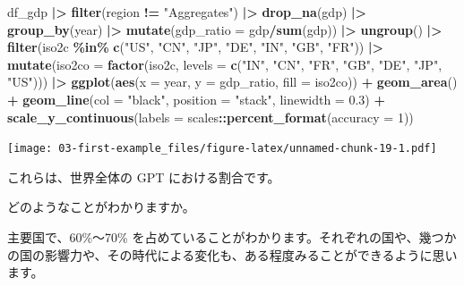 \documentclass[
  xelatex, ja=standard]{bxjsbook}
\newenvironment{Shaded}{\begin{snugshade}}{\end{snugshade}}
\newcommand{\AttributeTok}[1]{\textcolor[rgb]{0.13,0.29,0.53}{#1}}
\newcommand{\DecValTok}[1]{\textcolor[rgb]{0.00,0.00,0.81}{#1}}
\newcommand{\FloatTok}[1]{\textcolor[rgb]{0.00,0.00,0.81}{#1}}
\newcommand{\FunctionTok}[1]{\textcolor[rgb]{0.13,0.29,0.53}{\textbf{#1}}}
\newcommand{\NormalTok}[1]{#1}
\newcommand{\SpecialCharTok}[1]{\textcolor[rgb]{0.81,0.36,0.00}{\textbf{#1}}}
\newcommand{\StringTok}[1]{\textcolor[rgb]{0.31,0.60,0.02}{#1}}
\theoremstyle{definition}
\theoremstyle{definition}
\theoremstyle{definition}
\theoremstyle{definition}
\theoremstyle{remark}
\begin{document}
\begin{Shaded}
\begin{Highlighting}[]
\NormalTok{df\_gdp }\SpecialCharTok{|\textgreater{}} 
  \FunctionTok{filter}\NormalTok{(region }\SpecialCharTok{!=} \StringTok{"Aggregates"}\NormalTok{) }\SpecialCharTok{|\textgreater{}} \FunctionTok{drop\_na}\NormalTok{(gdp) }\SpecialCharTok{|\textgreater{}} 
  \FunctionTok{group\_by}\NormalTok{(year) }\SpecialCharTok{|\textgreater{}} \FunctionTok{mutate}\NormalTok{(}\AttributeTok{gdp\_ratio =}\NormalTok{ gdp}\SpecialCharTok{/}\FunctionTok{sum}\NormalTok{(gdp)) }\SpecialCharTok{|\textgreater{}} \FunctionTok{ungroup}\NormalTok{() }\SpecialCharTok{|\textgreater{}}
  \FunctionTok{filter}\NormalTok{(iso2c }\SpecialCharTok{\%in\%} \FunctionTok{c}\NormalTok{(}\StringTok{"US"}\NormalTok{, }\StringTok{"CN"}\NormalTok{, }\StringTok{"JP"}\NormalTok{, }\StringTok{"DE"}\NormalTok{, }\StringTok{"IN"}\NormalTok{, }\StringTok{"GB"}\NormalTok{, }\StringTok{"FR"}\NormalTok{))  }\SpecialCharTok{|\textgreater{}}
  \FunctionTok{mutate}\NormalTok{(}\AttributeTok{iso2co =} \FunctionTok{factor}\NormalTok{(iso2c, }\AttributeTok{levels =} \FunctionTok{c}\NormalTok{(}\StringTok{"IN"}\NormalTok{, }\StringTok{"CN"}\NormalTok{, }\StringTok{"FR"}\NormalTok{, }\StringTok{"GB"}\NormalTok{, }\StringTok{"DE"}\NormalTok{, }\StringTok{"JP"}\NormalTok{, }\StringTok{"US"}\NormalTok{))) }\SpecialCharTok{|\textgreater{}}
  \FunctionTok{ggplot}\NormalTok{(}\FunctionTok{aes}\NormalTok{(}\AttributeTok{x =}\NormalTok{ year, }\AttributeTok{y =}\NormalTok{ gdp\_ratio, }\AttributeTok{fill =}\NormalTok{ iso2co)) }\SpecialCharTok{+} \FunctionTok{geom\_area}\NormalTok{() }\SpecialCharTok{+}
  \FunctionTok{geom\_line}\NormalTok{(}\AttributeTok{col =} \StringTok{"black"}\NormalTok{, }\AttributeTok{position =} \StringTok{"stack"}\NormalTok{, }\AttributeTok{linewidth =} \FloatTok{0.3}\NormalTok{) }\SpecialCharTok{+} 
  \FunctionTok{scale\_y\_continuous}\NormalTok{(}\AttributeTok{labels =}\NormalTok{ scales}\SpecialCharTok{::}\FunctionTok{percent\_format}\NormalTok{(}\AttributeTok{accuracy =} \DecValTok{1}\NormalTok{))}
\end{Highlighting}
\end{Shaded}

\texttt{[image: 03-first-example\_files/figure-latex/unnamed-chunk-19-1.pdf]}

これらは、世界全体の GPT における割合です。

どのようなことがわかりますか。

主要国で、60\%〜70\% を占めていることがわかります。それぞれの国や、幾つかの国の影響力や、その時代による変化も、ある程度みることができるように思います。
\end{document}
